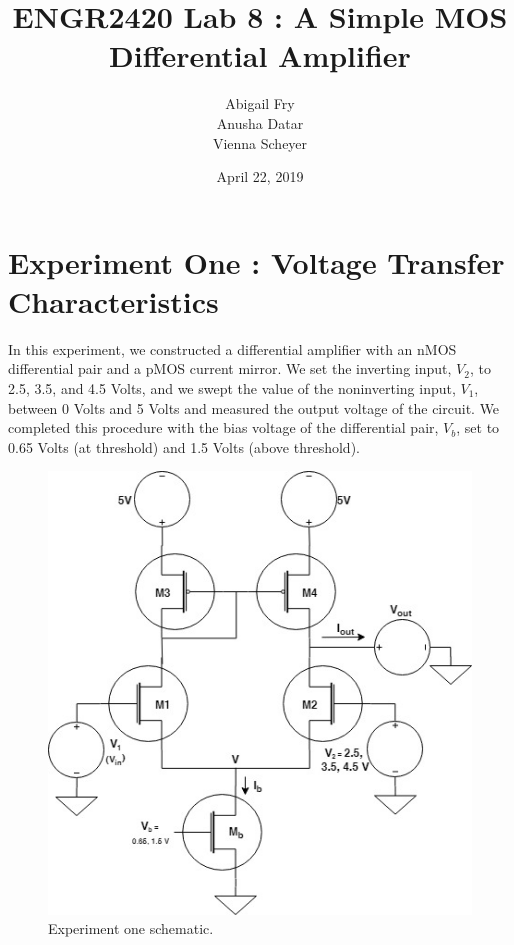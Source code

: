 \documentclass{article}
\title{ENGR2420 Lab 8 : A Simple MOS Differential Amplifier}
\author{Abigail Fry\\ Anusha Datar\\ Vienna Scheyer}
\date{April 22, 2019}
\begin{document}
\maketitle

\section{Experiment One : Voltage Transfer Characteristics}
In this experiment, we constructed a differential amplifier with an nMOS differential pair and a pMOS current mirror. We set the inverting input, $V_2$, to 2.5, 3.5, and 4.5 Volts, and we swept the value of the noninverting input, $V_1$, between 0 Volts and 5 Volts and measured the output voltage of the circuit. We completed this procedure with the bias voltage of the differential pair, $V_b$, set to 0.65 Volts (at threshold) and 1.5 Volts (above threshold).
\begin{figure}[H]
  \begin{center}      
  \includegraphics[scale = 0.5]{images/exp1_schematic.jpg}
  \caption{Experiment one schematic.}   
  \label{fig:exp1_schematic}
  \end{center}
\end{figure}
\end{document}
